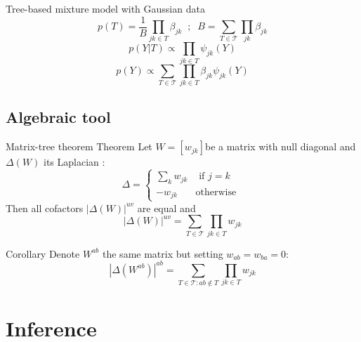 \documentclass[11pt]{beamer}
\newcommand{\emphase}[1]{\textcolor{Complement}{#1}}
\begin{document}
\begin{frame}{Tree-based mixture model with Gaussian data}
$$p(T) = \frac{1}{B}\prod_{jk\in T}\beta_{jk} \;\; ; \;\;B = \sum_{T \in \mathcal{T} } \prod_{jk} \beta_{jk} $$
$$p(Y|T) \propto \prod_{jk \in T} \psi_{jk}(Y)$$ 
$$ p(Y) \propto \sum_{T\in\mathcal{T}} \prod_{jk\in T} \beta_{jk} \psi_{jk}(Y)$$
\end{frame}
\subsection{Algebraic tool}
\begin{frame}{Matrix-tree theorem}
\emphase{Theorem} \citep{matrixtree} Let $W=[w_{jk}] $be a matrix with null diagonal and $\Delta(W)$ its Laplacian :
$$\Delta=\left\{ 
					\begin{array}{ll}
						\sum_k w_{jk}& \text{ if } j=k\\
						-w_{jk} & \text{otherwise }
					\end{array}
				\right.$$
Then all cofactors $|\Delta(W)|^{uv} $ are equal and
$$ |\Delta(W)|^{uv} = \sum_{T\in\mathcal{T}}\prod_{jk \in T} w_{jk} $$

\emphase{Corollary} Denote $W^{ab}$ the same matrix but setting $w_{ab}=w_{ba}=0$:
$$  |\Delta(W^{ab})|^{ab}  = \sum_{T\in\mathcal{T}:ab\notin T}\prod_{jk\in T} w_{jk}$$
\end{frame}
\section{Inference}
\end{document}
